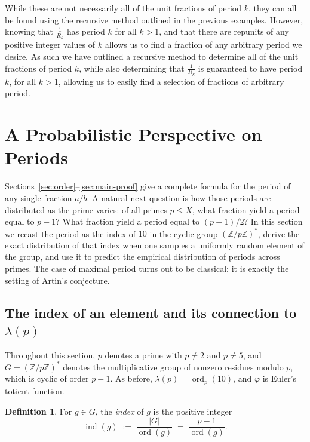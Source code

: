 \documentclass[12pt]{amsart}
\theoremstyle{definition}
\newtheorem{definition}[theorem]{Definition}
\theoremstyle{remark}
\newcommand{\Z}{\mathbb{Z}}
\newcommand{\ord}{\operatorname{ord}}
\newcommand{\ind}{\operatorname{ind}}
\begin{document}
While these are not necessarily all of the unit fractions of period $k$, they can all be found using the recursive method outlined in the previous examples. However, knowing that $\frac{1}{R_k}$ has period $k$ for all $k>1$, and that there are repunits of any positive integer values of $k$ allows us to find a fraction of any arbitrary period we desire. As such we have outlined a recursive method to determine all of the unit fractions of period $k$, while also determining that $\frac{1}{R_k}$ is guaranteed to have period $k$, for all $k>1$, allowing us to easily find a selection of fractions of arbitrary period.
\section{A Probabilistic Perspective on Periods}\label{sec:probabilistic}

Sections~\ref{sec:order}--\ref{sec:main-proof} give a complete formula for
the period of any single fraction $a/b$. A natural next question is how
those periods are distributed as the prime varies: of all primes
$p \le X$, what fraction yield a period equal to $p - 1$? What fraction
yield a period equal to $(p-1)/2$? In this section we recast the period
as the index of $10$ in the cyclic group $(\Z/p\Z)^*$, derive the exact
distribution of that index when one samples a uniformly random element of
the group, and use it to predict the empirical distribution of periods
across primes. The case of maximal period turns out to be classical: it is
exactly the setting of Artin's conjecture.

\subsection{The index of an element and its connection to $\lambda(p)$}
\label{subsec:index}

Throughout this section, $p$ denotes a prime with $p \neq 2$ and $p \neq 5$,
and $G = (\Z/p\Z)^*$ denotes the multiplicative group of nonzero residues
modulo $p$, which is cyclic of order $p - 1$. As before, $\lambda(p) =
\ord_p(10)$, and $\varphi$ is Euler's totient function.

\begin{definition}\label{def:index}
For $g \in G$, the \emph{index} of $g$ is the positive integer
\[
    \ind(g) \;:=\; \frac{|G|}{\ord(g)} \;=\; \frac{p - 1}{\ord(g)}.
\]
\end{definition}
\end{document}
